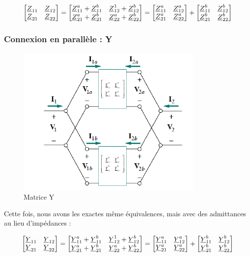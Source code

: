 \documentclass[12pt,a4paper]{article}
\newcommand{\uz}{\uline{Z} }
\newcommand{\uy}{\uline{Y} }
\begin{document}
\begin{equation}
\begin{bmatrix}
	\uz_{11} & \uz_{12}\\
	\uz_{21} & \uz_{22}
\end{bmatrix} = \begin{bmatrix}
	\uz_{11}^a + \uz_{11}^b & \uz_{12}^1 + \uz_{12}^b\\
	\uz_{21}^a + \uz_{21}^b & \uz_{22}^a + \uz_{22}^b
\end{bmatrix} = \begin{bmatrix}
	\uz_{11}^a & \uz_{12}^a\\
	\uz_{21}^a & \uz_{22}^a
\end{bmatrix} + \begin{bmatrix}
	\uz_{11}^b & \uz_{12}^b\\
	\uz_{21}^b & \uz_{22}^b
\end{bmatrix}
\end{equation}


\subsubsection{Connexion en parallèle : Y}
\begin{figure}[!h]
	\centering
	\includegraphics[scale=0.8]{images/matrice_y}
	\caption{Matrice Y}
\end{figure}
Cette fois, nous avons les exactes même équivalences, mais avec des admittances au lieu d'impédances :

\begin{equation}
\begin{bmatrix}
	\uy_{11} & \uy_{12}\\
	\uy_{21} & \uy_{22}
\end{bmatrix} = \begin{bmatrix}
	\uy_{11}^a + \uy_{11}^b & \uy_{12}^1 + \uy_{12}^b\\
	\uy_{21}^a + \uy_{21}^b & \uy_{22}^a + \uy_{22}^b
\end{bmatrix} = \begin{bmatrix}
	\uy_{11}^a & \uy_{12}^a\\
	\uy_{21}^a & \uy_{22}^a
\end{bmatrix} + \begin{bmatrix}
	\uy_{11}^b & \uy_{12}^b\\
	\uy_{21}^b & \uy_{22}^b
\end{bmatrix}
\end{equation}
\end{document}

